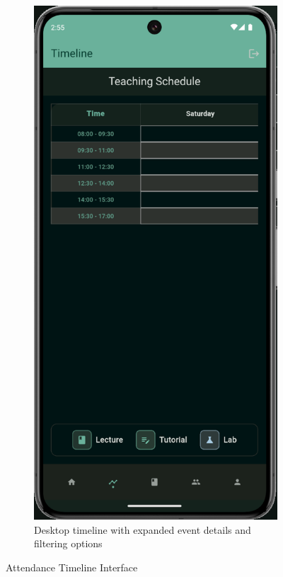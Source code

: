 \begin{figure}[H]
\begin{subfigure}[b]{0.35\textwidth}
        \includegraphics[width=\textwidth]{images/rachid/teacher-side-timeline-desktop.png}
        \caption{Desktop timeline with expanded event details and filtering options}
    \end{subfigure}
    \caption{Attendance Timeline Interface}
    \label{fig:timeline-interface}
\end{figure}

